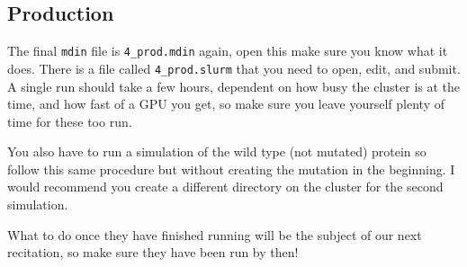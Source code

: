 \documentclass[11pt]{article}
\begin{document}
\subsection{Production}
The final \texttt{mdin} file is \texttt{4\_prod.mdin} again, open this make sure you know what it does. There is a file called \texttt{4\_prod.slurm} that you need to open, edit, and submit. A single run should take a few hours, dependent on how busy the cluster is at the time, and how fast of a GPU you get, so make sure you leave yourself plenty of time for these too run.

You also have to run a simulation of the wild type (not mutated) protein so follow this same procedure but without creating the mutation in the beginning. I would recommend you create a different directory on the cluster for the second simulation.

What to do once they have finished running will be the subject of our next recitation, so make sure they have been run by then!
\end{document}
